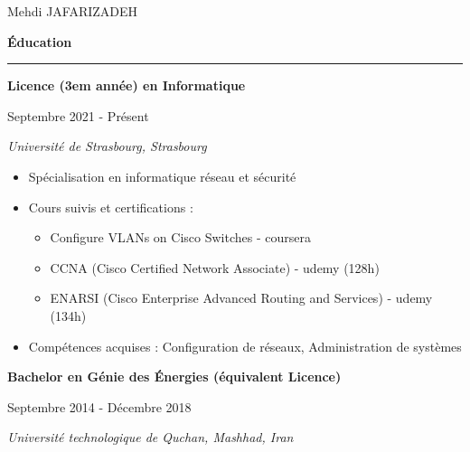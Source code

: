 \documentclass[a4paper]{letter}
\newcommand{\divider}{\rule{\linewidth}{0.9pt}}
\begin{document}
\begin{minipage}[t]{0.60\textwidth}


\setlength{\baselineskip}{1.5\baselineskip}
\vspace{0.7cm}

{\huge Mehdi JAFARIZADEH}

\vspace{0.7cm}


{\large \textbf{Éducation}}
\divider


{\textbf{Licence (3em année) en Informatique}}

{\footnotesize Septembre 2021 - Présent}

{\textit{Université de Strasbourg, Strasbourg}}

\vspace{1mm}

\begin{itemize}
    \footnotesize
    \item Spécialisation en informatique réseau et sécurité
    \item Cours suivis et certifications :
        \begin{itemize}
            \item Configure VLANs on Cisco Switches - coursera
            \item CCNA (Cisco Certified Network Associate) - udemy (128h)
            \item ENARSI (Cisco Enterprise Advanced Routing and Services) - udemy (134h)
        \end{itemize}
    \item Compétences acquises : Configuration de réseaux, Administration de systèmes
\end{itemize}

\vspace{3mm}


{\textbf{Bachelor en Génie des Énergies (équivalent Licence)}}

{\footnotesize Septembre 2014 - Décembre 2018}

{\textit{Université technologique de Quchan, Mashhad, Iran}}

\vspace{1mm}


\end{minipage}
\end{document}
